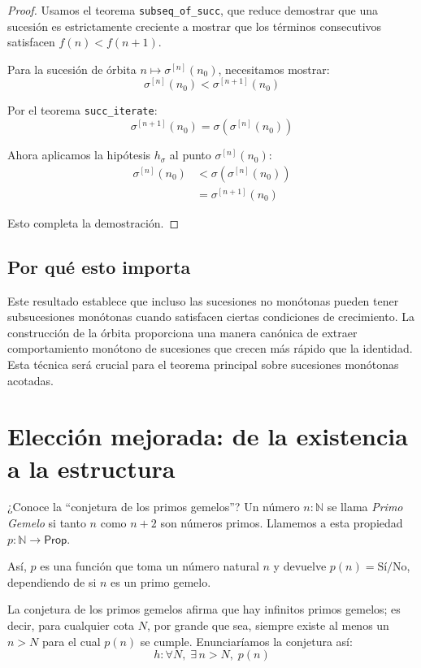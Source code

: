 \begin{proof}
Usamos el teorema \texttt{subseq\_of\_succ}, que reduce demostrar que una
sucesión es estrictamente creciente a mostrar que los términos consecutivos
satisfacen $f(n) < f(n+1)$.

Para la sucesión de órbita $n \mapsto \sigma^{[n]}(n_0)$, necesitamos
mostrar:
\[
  \sigma^{[n]}(n_0) < \sigma^{[n+1]}(n_0)
\]

Por el teorema \texttt{succ\_iterate}:
\[
  \sigma^{[n+1]}(n_0) = \sigma(\sigma^{[n]}(n_0))
\]

Ahora aplicamos la hipótesis $h_\sigma$ al punto $\sigma^{[n]}(n_0)$:
\begin{align*}
  \sigma^{[n]}(n_0) &< \sigma(\sigma^{[n]}(n_0)) \\
               &= \sigma^{[n+1]}(n_0)
\end{align*}

Esto completa la demostración.
\end{proof}

\subsection{Por qué esto importa}

Este resultado establece que incluso las sucesiones no monótonas pueden
tener subsucesiones monótonas cuando satisfacen ciertas condiciones de
crecimiento. La construcción de la órbita proporciona una manera canónica
de extraer comportamiento monótono de sucesiones que crecen más rápido que
la identidad. Esta técnica será crucial para el teorema principal sobre
sucesiones monótonas acotadas.

\section{Elección mejorada: de la existencia a la estructura}

¿Conoce la ``conjetura de los primos gemelos''? Un número $n : \mathbb{N}$
se llama \emph{Primo Gemelo} si tanto $n$ como $n+2$ son números primos.
Llamemos a esta propiedad $p : \mathbb{N} \to \mathsf{Prop}$.

Así, $p$ es una función que toma un número natural $n$ y devuelve
$p(n) = \text{Sí}/\text{No}$, dependiendo de si $n$ es un primo gemelo.

La conjetura de los primos gemelos afirma que hay infinitos primos gemelos;
es decir, para cualquier cota $N$, por grande que sea, siempre existe al
menos un $n > N$ para el cual $p(n)$ se cumple. Enunciaríamos la conjetura
así:
\[
  h : \forall N,\; \exists\, n > N,\; p(n)
\]

